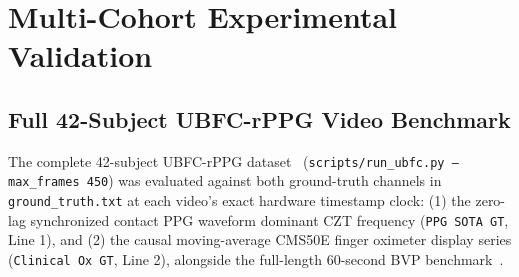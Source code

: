 \documentclass[conference]{IEEEtran}
\begin{document}
\section{Multi-Cohort Experimental Validation}

\subsection{Full 42-Subject UBFC-rPPG Video Benchmark}
\label{sec:exp_ubfc}

The complete 42-subject UBFC-rPPG dataset~\cite{bobbia2019ubfc} (\texttt{scripts/run\_ubfc.py --max\_frames 450}) was evaluated against both ground-truth channels in \texttt{ground\_truth.txt} at each video's exact hardware timestamp clock: (1) the zero-lag synchronized contact PPG waveform dominant CZT frequency (\texttt{PPG SOTA GT}, Line 1), and (2) the causal moving-average CMS50E finger oximeter display series (\texttt{Clinical Ox GT}, Line 2), alongside the full-length 60-second BVP benchmark~\cite{liu2023rppgtoolbox}.
\end{document}
